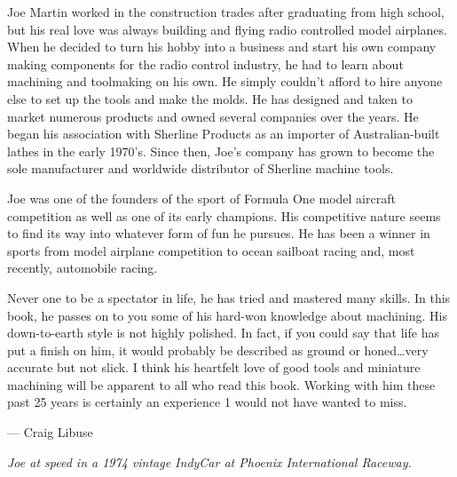 \secdown
{}\secdown

Joe Martin worked in the construction trades after graduating from high school,
but his real love was always building and flying radio controlled model
airplanes. When he decided to turn his hobby into a business and start his own
company making components for the radio control industry, he had to learn about
machining and toolmaking on his own. He simply couldn't afford to hire anyone
else to set up the tools and make the molds. He has designed and taken to market
numerous products and owned several companies over the years. He began his
association with Sherline Products as an importer of Australian-built lathes in
the early 1970's. Since then, Joe's company has grown to become the sole
manufacturer and worldwide distributor of Sherline machine tools.

Joe was one of the founders of the sport of Formula One model aircraft
competition as well as one of its early champions. His competitive nature seems
to find its way into whatever form of fun he pursues. He has been a winner in
sports from model airplane competition to ocean sailboat racing and, most
recently, automobile racing.

Never one to be a spectator in life, he has tried and mastered many skills. In
this book, he passes on to you some of his hard-won knowledge about machining.
His down-to-earth style is not highly polished. In fact, if you could say that
life has put a finish on him, it would probably be described as ground or
honed\ldots very accurate but not slick. I think his heartfelt love of good
tools and miniature machining will be apparent to all who read this book.
Working with him these past 25 years is certainly an experience 1 would not have
wanted to miss.

\bigskip
--- Craig Libuse

\bigskip
\textit{Joe at speed in a 1974 vintage IndyCar at Phoenix International
Raceway.}

\secup
\secup
